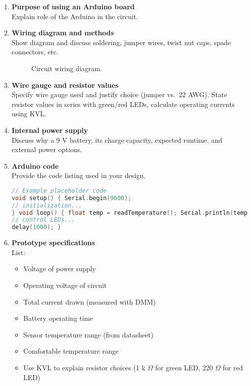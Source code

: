 \documentclass[10pt]{article} \usepackage[margin=1in]{geometry}
\begin{document}
\begin{enumerate}
	\item \textbf{Purpose of using an Arduino board}\\ Explain role of the Arduino
	      in the circuit.

	\item \textbf{Wiring diagram and methods}\\ Show diagram and discuss soldering,
	      jumper wires, twist nut caps, spade connectors, etc.  \begin{figure}[H]
		      \centering
		      \caption{Circuit wiring diagram.} \end{figure}

	\item \textbf{Wire gauge and resistor values}\\ Specify wire gauge used and
	      justify choice (jumper vs.\ 22 AWG).  State resistor values in series with
	      green/red LEDs, calculate operating currents using KVL.

	\item \textbf{Internal power supply}\\ Discuss why a 9 V battery, its charge
	      capacity, expected runtime, and external power options.

	\item \textbf{Arduino code}\\ Provide the code listing used in your design.
	      \begin{lstlisting}[language=C, caption={Arduino sketch for temperature
monitoring}]
// Example placeholder code
void setup() { Serial.begin(9600);
// initialization...
} void loop() { float temp = readTemperature(); Serial.println(temp);
// control LEDs...
delay(1000); } \end{lstlisting}


	\item \textbf{Prototype specifications}\\ List: \begin{itemize} \item Voltage of
		            power supply \item Operating voltage of circuit \item Total current drawn
		            (measured with DMM) \item Battery operating time \item Sensor temperature range
		            (from datasheet) \item Comfortable temperature range \item Use KVL to explain
		            resistor choices (1 k $\Omega$ for green LED, 220 $\Omega$ for red LED)
	      \end{itemize}

\end{enumerate}
\end{document}
